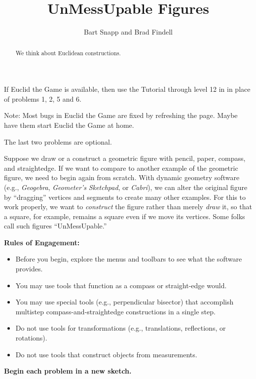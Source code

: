 \documentclass[nooutcomes]{ximera}
\title{UnMessUpable Figures}
\author{Bart Snapp and Brad Findell}
\begin{document}
\begin{abstract}
  We think about Euclidean constructions.
\end{abstract}
\maketitle

\begin{teachingnote}
If Euclid the Game is available, then use the Tutorial through level 12 in in place of problems 1, 2, 5 and 6.  

Note:  Most bugs in Euclid the Game are fixed by refreshing the page.  Maybe have them start Euclid the Game at home.  

The last two problems are optional.
\end{teachingnote}

 
Suppose we draw or a construct a geometric figure with pencil, paper, compass, and straightedge.  If we want to compare to another example of the geometric figure, we need to begin again from scratch.  With dynamic geometry software (e.g., \textsl{Geogebra}, \textsl{Geometer's Sketchpad}, or \textsl{Cabri}), we can alter the original figure by ``dragging'' vertices and segments to create many other examples.  For this to work properly, we want to \emph{construct} the figure rather than merely \emph{draw} it, so that a square, for example, remains a square even if we move its vertices.  Some folks call such figures ``UnMessUpable.'' 

\vspace{0.1in}
\begin{center}
\textbf{Rules of Engagement:}
\end{center}
\begin{itemize}
\itemsep0em
\item Before you begin, explore the menus and toolbars to see what the software provides.  
\item You may use tools that function as a compass or straight-edge would.  
\item You may use special tools (e.g., perpendicular bisector) that accomplish multistep     
compass-and-straightedge constructions in a single step.
\item Do not use tools for transformations (e.g., translations, reflections, or rotations).
\item Do not use tools that construct objects from measurements.  
\end{itemize}

\begin{center}
\textbf{Begin each problem in a new sketch.}
\end{center}
\end{document}
